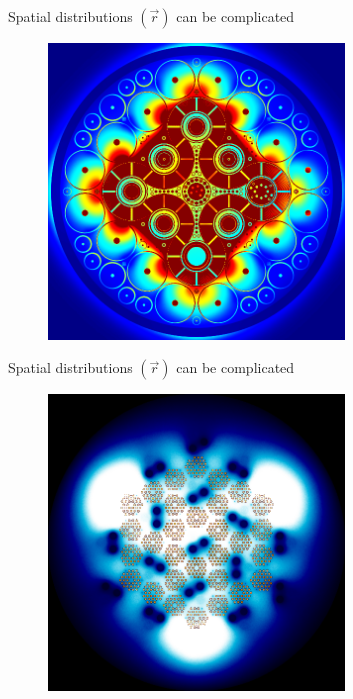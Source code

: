 \documentclass{beamer}
\begin{document}
        \begin{frame}{Spatial distributions $(\vec r)$ can be complicated}
            \begin{figure}
                \centering
                \includegraphics[width=0.7\textwidth]{./img/spaceFlux2.png}
                \caption*{}
            \end{figure}
        \end{frame}

        \begin{frame}{Spatial distributions $(\vec r)$ can be complicated}
            \begin{figure}
                \centering
                \includegraphics[width=0.7\textwidth]{./img/spaceFlux3.png}
                \caption*{}
            \end{figure}
        \end{frame}
\end{document}
